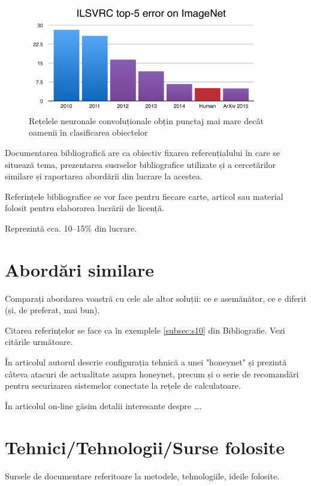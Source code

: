 \begin{figure}[h!]
    	\centering
	\captionsetup{justification=centering, margin=2cm}
	\includegraphics[width=0.9\textwidth]{figures/top_five_errors_ILSVRC.png}
	\caption{Rețelele neuronale convoluționale obțin punctaj mai mare decât oamenii în clasificarea obiectelor \cite{historyCNN}}
	\label{fig:historyCNN}
\end{figure}


Documentarea bibliografică are ca obiectiv fixarea referențialului în care se situează tema, prezentarea susrselor bibliografice utilizate și a cercetărilor similare și raportarea abordării din lucrare la acestea.

Referințele bibliografice se vor face pentru fiecare carte, articol sau material folosit pentru elaborarea lucrării de licență. 

Reprezintă cca. 10--15\% din lucrare.


\section{Abordări similare}

Comparați abordarea voastră cu cele ale altor soluții: ce e asemănător, ce e diferit (și, de preferat, mai bun). 

Citarea referințelor se face ca în exemplele \ref{subsec:s10} din Bibliografie. 
Vezi citările următoare.

În articolul \cite{Antoniou04} autorul descrie configurația tehnică a unei "honeynet" și prezintă câteva atacuri de actualitate asupra honeynet, precum și o serie de recomandări pentru securizarea sistemelor conectate la rețele de calculatoare.


În articolul on-line \cite{electronic-citation} găsim detalii interesante despre \dots.


\section{Tehnici/Tehnologii/Surse folosite}

Sursele de documentare referitoare la metodele, tehnologiile, ideile folosite. 




